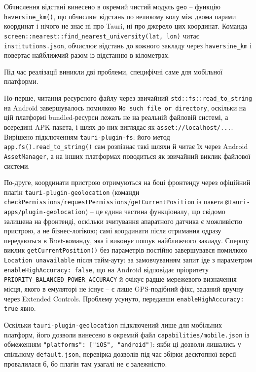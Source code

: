 \documentclass[14pt, a4paper]{extreport}
\begin{document}
	Обчислення відстані винесено в окремий чистий модуль \texttt{geo} -- функцію \texttt{haversine\_km()}, що обчислює відстань по великому колу між двома парами координат і нічого не знає ні про Tauri, ні про джерело цих координат. Команда \texttt{screen::nearest::find\_nearest\_university(lat, lon)} читає \texttt{institutions.json}, обчислює відстань до кожного закладу через \texttt{haversine\_km} і повертає найближчий разом із відстанню в кілометрах.
	
	
	Під час реалізації виникли дві проблеми, специфічні саме для мобільної платформи.
	
	По-перше, читання ресурсного файлу через звичайний \texttt{std::fs::read\_to\_string} на Android завершувалось помилкою \texttt{No such file or directory}, оскільки на цій платформі bundled-ресурси лежать не на реальній файловій системі, а всередині APK-пакета, і шлях до них виглядає як \texttt{asset://localhost/...}. Вирішено підключенням \texttt{tauri-plugin-fs}: його метод \texttt{app.fs().read\_to\_string()} сам розпізнає такі шляхи й читає їх через Android \texttt{AssetManager}, а на інших платформах поводиться як звичайний виклик файлової системи.
	
	По-друге, координати пристрою отримуються на боці фронтенду через офіційний плагін \texttt{tauri-plugin-geolocation} (команди \texttt{checkPermissions}/\texttt{requestPermissions}/\texttt{getCurrentPosition} із пакета \texttt{@tauri-apps/plugin-geolocation}) -- це єдина частина функціоналу, що свідомо залишена на фронтенді, оскільки зчитування апаратного датчика є можливістю пристрою, а не бізнес-логікою; самі координати після отримання одразу передаються в Rust-команду, яка і виконує пошук найближчого закладу. Спершу виклик \texttt{getCurrentPosition()} без параметрів постійно завершувався помилкою \texttt{Location unavailable} після тайм-ауту: за замовчуванням запит іде з параметром \texttt{enableHighAccuracy: false}, що на Android відповідає пріоритету \texttt{PRIORITY\_BALANCED\_POWER\_ACCURACY} й очікує радше мережевого визначення місця, якого в емуляторі не існує -- є лише GPS-подібний фікс, заданий вручну через Extended Controls. Проблему усунуто, передавши \texttt{enableHighAccuracy: true} явно.
	
	Оскільки \texttt{tauri-plugin-geolocation} підключений лише для мобільних платформ, його дозволи винесено в окремий файл \texttt{capabilities/mobile.json} із обмеженням \texttt{"platforms": ["iOS", "android"]}: якби ці дозволи лишались у спільному \texttt{default.json}, перевірка дозволів під час збірки десктопної версії провалилася б, бо плагін там узагалі не є залежністю.
	
\end{document}
